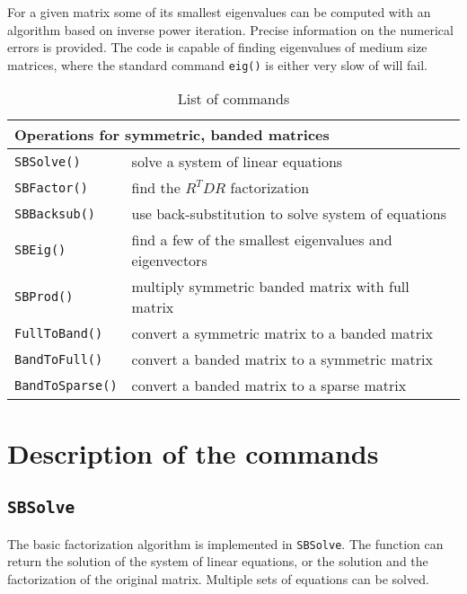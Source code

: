 \documentclass[11pt]{article}
\newcommand{\ID}[1]{\index{#1}}
\begin{document}
For a given matrix some of its smallest eigenvalues can be computed with an
algorithm based on inverse power iteration. Precise information on the
numerical errors is provided. The code is capable of finding eigenvalues of
medium size matrices, where the standard command \texttt{eig()} is either very
slow of will fail.


\begin{table}[htbp]
  \begin{center}
\begin{tabular}{|l|l|}\hline
\multicolumn{2}{|l|}{Operations for symmetric, banded matrices}\\\hline
\texttt{SBSolve()} & solve a system of linear equations \\
\texttt{SBFactor()} & find the $R^TDR$ factorization \\
\texttt{SBBacksub()} & use back-substitution to solve system of equations\\
\texttt{SBEig()} & find a few of the smallest eigenvalues and eigenvectors\\
\texttt{SBProd()} & multiply symmetric banded matrix with full matrix\\
\texttt{FullToBand()} & convert a symmetric matrix to a banded matrix\\
\texttt{BandToFull()} & convert a banded matrix to a symmetric matrix\\
\texttt{BandToSparse()} & convert a banded matrix to a sparse matrix\\
\hline\end{tabular}
    \caption{List of commands}
    \label{tab:commands}
  \end{center}
\end{table}
\begin{center}
\end{center}


\section{Description of the commands}
 
\subsection{\texttt{SBSolve}}\ID{SBSolve}
The basic factorization algorithm is implemented in \texttt{SBSolve}. The
function can return the solution of the system of linear equations, or the
solution and the factorization of the original matrix.
Multiple sets of equations can be solved.
\end{document}
